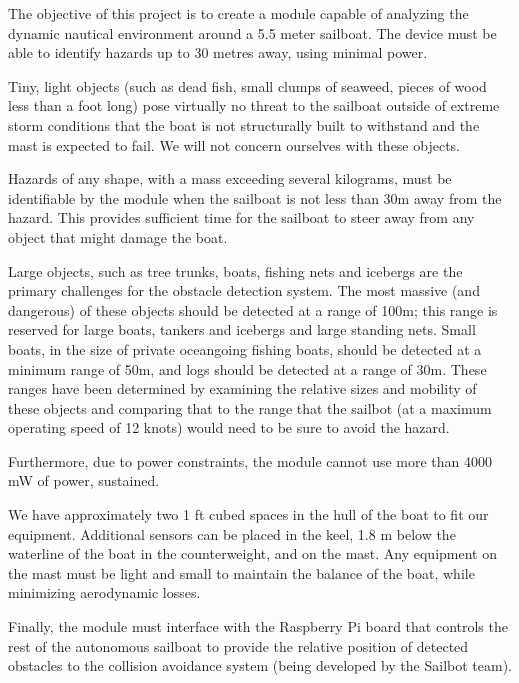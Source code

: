 The objective of this project is to create a module capable of analyzing the dynamic nautical environment around a 5.5 meter sailboat. The device must be able to identify hazards up to 30 metres away, using minimal power.

Tiny, light objects (such as dead fish, small clumps of seaweed, pieces of wood less than a foot long) pose virtually no threat to the sailboat outside of extreme storm conditions that the boat is not structurally built to withstand and the mast is expected to fail. We will not concern ourselves with these objects.

Hazards of any shape, with a mass exceeding several kilograms, must be identifiable by the module when the sailboat is not less than 30m away from the hazard. This provides sufficient time for the sailboat to steer away from any object that might damage the boat.

Large objects, such as tree trunks, boats, fishing nets and icebergs are the primary challenges for the obstacle detection system. The most massive (and dangerous) of these objects should be detected at a range of 100m; this range is reserved for large boats, tankers and icebergs and large standing nets. Small boats, in the size of private oceangoing fishing boats, should be detected at a minimum range of 50m, and logs should be detected at a range of 30m. These ranges have been determined by examining the relative sizes and mobility of these objects and comparing that to the range that the sailbot (at a maximum operating speed of 12 knots) would need to be sure to avoid the hazard.

Furthermore, due to power constraints, the module cannot use more than 4000 mW of power, sustained.

We have approximately two 1 ft cubed spaces in the hull of the boat to fit our equipment. Additional sensors can be placed in the keel, 1.8 m below the waterline of the boat in the counterweight, and on the mast. Any equipment on the mast must be light and small to maintain the balance of the boat, while minimizing aerodynamic losses.

Finally, the module must interface with the Raspberry Pi board that controls the rest of the autonomous sailboat to provide the relative position of detected obstacles to the collision avoidance system (being developed by the Sailbot team).